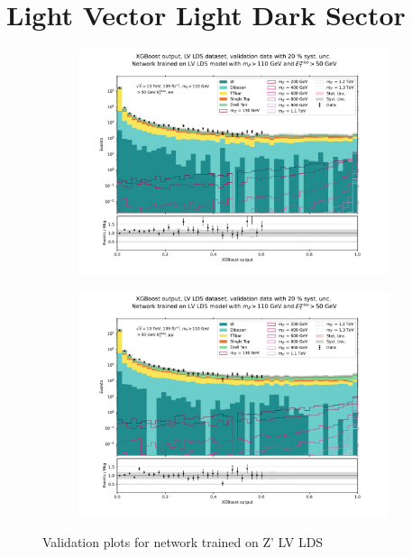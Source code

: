 \documentclass[12pt, a4paper]{book}
\begin{document}
\section{Light Vector Light Dark Sector}
\begin{figure}[!ht]
	\centering
	\begin{subfigure}[b]{0.49\textwidth}
      \centering
      \includegraphics[width=1\textwidth]{XGBoost/LV_LDS/VAL_ee.pdf}
      \end{subfigure}
   \hfill
   \begin{subfigure}[b]{0.49\textwidth}
      \centering
      \includegraphics[width=1\textwidth]{XGBoost/LV_LDS/VAL_uu.pdf}
      \end{subfigure}
   \caption{Validation plots for network trained on Z' LV LDS}\label{fig:LV_LDS_vals}
\end{figure}
\end{document}
